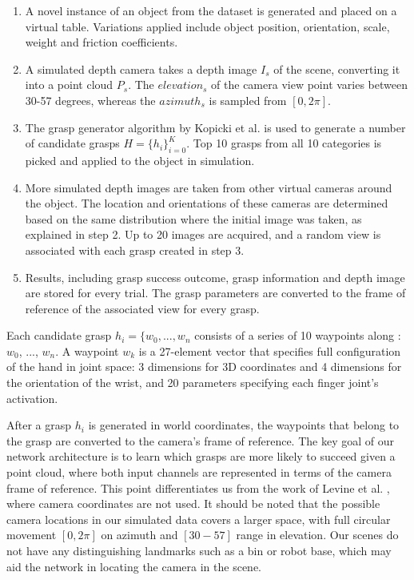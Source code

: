 \begin{enumerate}
\item A novel instance of an object from the dataset is generated and placed on a virtual table. Variations applied include object position, orientation, scale, weight and friction coefficients.
\item A simulated depth camera takes a depth image $I_s$ of the scene, converting it into a point cloud $P_s$. The ${elevation}_s$ of the camera view point varies between 30-57 degrees, whereas the ${azimuth}_s$ is sampled from $[0, 2\pi]$. 
\item The grasp generator algorithm by Kopicki et al. \cite{kopicki2015ijrr} is used to generate a number of candidate grasps $H = \{h_i\}_{i=0}^{K}$. Top 10 grasps from all 10 categories is picked and applied to the object in simulation.
\item More simulated depth images are taken from other virtual cameras around the object. The location and orientations of these cameras are determined based on the same distribution where the initial image was taken, as explained in step 2. Up to 20 images are acquired, and a random view is associated with each grasp created in step 3. 
\item Results, including grasp success outcome, grasp information and depth image are stored for every trial. The grasp parameters are converted to the frame of reference of the associated view for every grasp.
\end{enumerate}

Each candidate grasp $h_i = \{w_0, ..., w_{n}$ consists of a series of 10 waypoints along : $w_0$, ..., $w_{n}$. A waypoint $w_k$ is a 27-element vector that specifies full configuration of the hand in joint space: 3 dimensions for 3D coordinates and 4 dimensions for the orientation of the wrist, and 20 parameters specifying each finger joint's activation. 

After a grasp $h_i$ is generated in world coordinates, the waypoints that belong to the grasp are converted to the camera's frame of reference. The key goal of our network architecture is to learn which grasps are more likely to succeed given a point cloud, where both input channels are represented in terms of the camera frame of reference. This point differentiates us from the work of Levine et al. \cite{Levine1}, where camera coordinates are not used. It should be noted that the possible camera locations in our simulated data covers a larger space, with full circular movement $[0, 2\pi]$ on azimuth and $[30-57]$ range in elevation. Our scenes do not have any distinguishing landmarks such as a bin or robot base, which may aid the network in locating the camera in the scene. 

